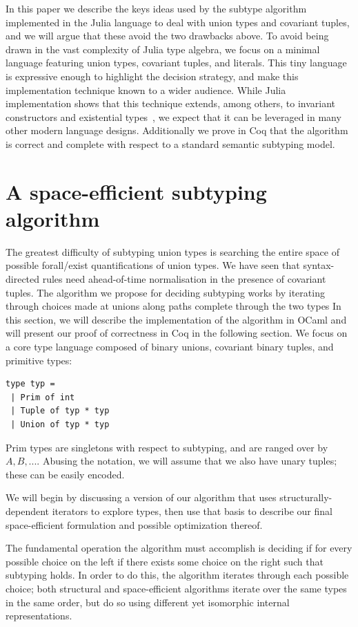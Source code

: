 \documentclass[a4paper,english]{lipics-v2019}
\begin{document}
In this paper we describe the keys ideas used by the subtype algorithm
implemented in the Julia language to deal with union types and covariant
tuples, and we will argue that these avoid the two drawbacks above.  To
avoid being drawn in the vast complexity of Julia type algebra, we focus on
a minimal language featuring union types, covariant tuples, and literals.
This tiny language is expressive enough to highlight the decision strategy,
and make this implementation technique known to a wider audience.  While
Julia implementation shows that this technique extends, among others, to
invariant constructors and existential types~\cite{DBLP:NardelliBPCBV18}, we
expect that it can be leveraged in many other modern language designs.
Additionally we prove in Coq that the algorithm is correct and complete with
respect to a standard semantic subtyping model.


\section{A space-efficient subtyping algorithm}

The greatest difficulty of subtyping union types is searching the entire
space of possible forall/exist quantifications of union types. We have seen
that syntax-directed rules need ahead-of-time normalisation in the presence
of covariant tuples.  The algorithm we propose for deciding subtyping works
by iterating through choices made at unions along paths complete through the
two types In this section, we will describe the implementation of the
algorithm in OCaml and will present our proof of correctness in Coq in the
following section.  We focus on a core type language composed of binary
unions, covariant binary tuples, and primitive types:

\begin{lstlisting}
type typ =
 | Prim of int
 | Tuple of typ * typ
 | Union of typ * typ
\end{lstlisting}

Prim types are singletons with respect to subtyping, and are ranged
over by
\(A, B, ...\).  Abusing the
notation, we will assume that we also have unary
tuples; these can be easily encoded. 

We will begin by discussing a version of our algorithm that uses structurally-
dependent iterators to explore types, then use that basis to describe our
final space-efficient formulation and possible optimization thereof. 

The fundamental operation the algorithm must accomplish is deciding if
for every possible choice on the left if there exists some choice on the
right such that subtyping holds. In order to do this, the algorithm iterates
through each possible choice; both structural and space-efficient algorithms
iterate over the same types in the same order, but do so using different yet 
isomorphic internal representations.
\end{document}
